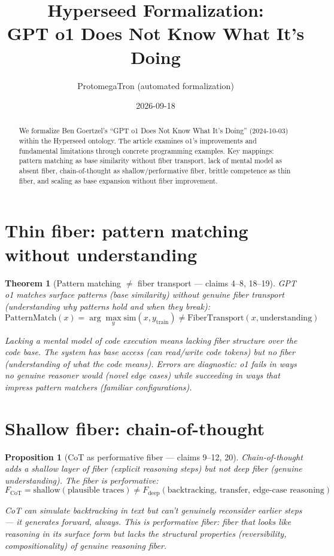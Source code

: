 \documentclass[11pt,a4paper]{article}
\title{Hyperseed Formalization:\\
  GPT o1 Does Not Know What It's Doing}
\author{ProtomegaTron (automated formalization)}
\date{2026-09-18}
\newtheorem{theorem}[definition]{Theorem}
\newtheorem{proposition}[definition]{Proposition}
\begin{document}
\maketitle

\begin{abstract}
We formalize Ben Goertzel's ``GPT o1 Does Not Know What It's Doing''
(2024-10-03) within the Hyperseed ontology. The article examines o1's
improvements and fundamental limitations through concrete programming
examples. Key mappings: pattern matching as base similarity without fiber
transport, lack of mental model as absent fiber, chain-of-thought as
shallow/performative fiber, brittle competence as thin fiber, and scaling
as base expansion without fiber improvement.
\end{abstract}

\tableofcontents

\section{Thin fiber: pattern matching without understanding}

\begin{theorem}[Pattern matching $\neq$ fiber transport --- claims 4--8, 18--19]
GPT o1 matches surface patterns (base similarity) without genuine fiber
transport (understanding why patterns hold and when they break):
\[
  \text{PatternMatch}(x) = \arg\max_y \text{sim}(x, y_{\text{train}})
  \neq \text{FiberTransport}(x, \text{understanding})
\]

Lacking a mental model of code execution means lacking fiber structure
over the code base. The system has base access (can read/write code tokens)
but no fiber (understanding of what the code means). Errors are diagnostic:
o1 fails in ways no genuine reasoner would (novel edge cases) while
succeeding in ways that impress pattern matchers (familiar configurations).
\end{theorem}

\section{Shallow fiber: chain-of-thought}

\begin{proposition}[CoT as performative fiber --- claims 9--12, 20]
Chain-of-thought adds a shallow layer of fiber (explicit reasoning steps)
but not deep fiber (genuine understanding). The fiber is performative:
\[
  F_{\text{CoT}} = \text{shallow}(\text{plausible traces})
  \neq F_{\text{deep}}(\text{backtracking, transfer, edge-case reasoning})
\]

CoT can simulate backtracking in text but can't genuinely reconsider
earlier steps --- it generates forward, always. This is performative fiber:
fiber that looks like reasoning in its surface form but lacks the structural
properties (reversibility, compositionality) of genuine reasoning fiber.
\end{proposition}
\end{document}
